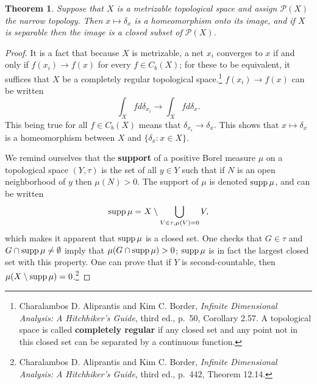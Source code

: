 \documentclass{article}
\newcommand{\supp}{\ensuremath\mathrm{supp}\,}
\newtheorem{theorem}{Theorem}
\theoremstyle{definition}
\begin{document}
\begin{theorem}
Suppose that $X$ is a metrizable topological space and assign $\mathscr{P}(X)$ the narrow topology.
Then $x \mapsto \delta_x$ is a homeomorphism onto its image, and if $X$ is separable then
the image is a closed subset of $\mathscr{P}(X)$.
\label{deltaembedding}
\end{theorem}
\begin{proof}
It is a fact that because $X$ is metrizable,
a net $x_i$ converges to $x$ if and only if $f(x_i) \to f(x)$ for every $f \in C_b(X)$; for these to be equivalent, it suffices that $X$ be a
completely
regular topological space.\footnote{Charalambos D. 
Aliprantis and Kim C. Border, {\em Infinite Dimensional Analysis: A Hitchhiker's Guide}, third ed., p.~50, Corollary 2.57. A topological space is called
\textbf{completely regular} if any closed set and any point not in this closed set can be separated by a continuous function.}
 $f(x_i) \to f(x)$ can be written
\[
\int_X f d\delta_{x_i} \to \int_X f d\delta_x.
\]
This being true for all $f \in C_b(X)$ means that $\delta_{x_i} \to \delta_x$. 
This shows that $x \mapsto \delta_x$ is a homeomorphism between $X$ and $\{\delta_x: x \in X\}$. 

We remind ourselves that the \textbf{support}  of a positive Borel measure $\mu$
on a topological space $(Y,\tau)$ is the set of all $y \in Y$ such that if $N$ is an open neighborhood
of $y$ then $\mu(N)>0$. The support of $\mu$ is denoted $\supp \mu$, and can be written
\[
\supp \mu = X\setminus  \bigcup_{V \in \tau, \mu(V) = 0} V,
\]
which makes it apparent that $\supp \mu$ is a closed set.
One checks that $G \in \tau$ and $G \cap \supp \mu \neq \emptyset$
imply that $\mu(G \cap \supp \mu)>0$; $\supp \mu$ is in fact the largest closed set with this property.
One can prove that if $Y$ is second-countable, then $\mu(X \setminus \supp \mu)=0$.\footnote{Charalambos D. 
Aliprantis and Kim C. Border, {\em Infinite Dimensional Analysis: A Hitchhiker's Guide}, third ed., p.~442, Theorem 12.14.}



\end{proof}
\end{document}
